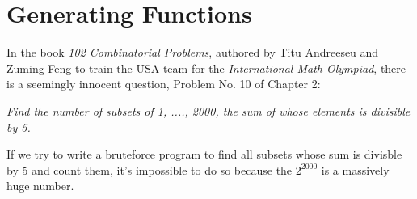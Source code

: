 \section*{Generating Functions}\cite{generatingfunction3b1b}
\label{appendix:generatingfunction}

In the book \textit{102 Combinatorial Problems}, authored by Titu Andreeseu and Zuming Feng to train the USA team for the \textit{International Math Olympiad}, there is a seemingly innocent question, Problem No. 10 of Chapter 2: 

\textit{Find the number of subsets of {1, ...., 2000}, the sum of whose elements is divisible by 5.}

If we try to write a bruteforce program to find all subsets whose sum is divisble by 5 and count them, it's impossible to do so because the $2^{2000}$ is a massively huge number.  